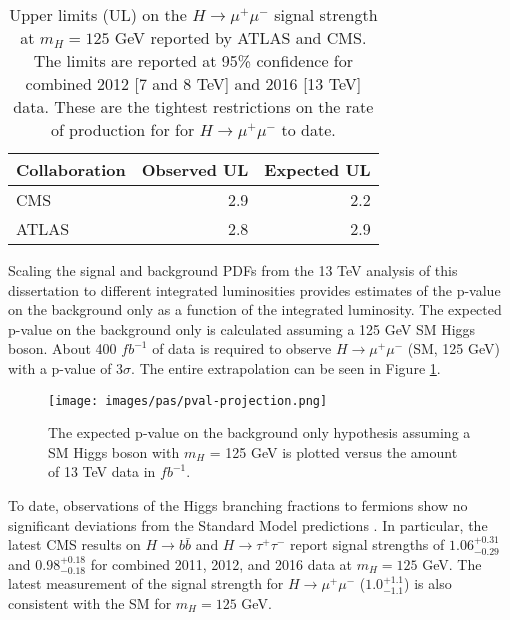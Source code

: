 \begin{table}[htb]
  \caption[Upper limits on the rate of production for $H\rightarrow\mu^+\mu^-$ at $m_H=125$ GeV.]{Upper limits (UL) on the $H\rightarrow\mu^+\mu^-$ signal strength at $m_H=125$ GeV reported by ATLAS \cite{atlashmumu2017} and CMS. The limits are reported at 95\% confidence for combined 2012 [7 and 8 TeV] and 2016 [13 TeV] data. These are the tightest restrictions on the rate of production for for $H\rightarrow\mu^+\mu^-$ to date.}
  \label{tab:cmsatlash2mu}
  \begin{center}
    \begin{tabular}{lrr}
      \hline
      Collaboration  & Observed UL & Expected UL  \\
      \hline
      CMS            &    2.9      & 2.2  \\
      ATLAS          &    2.8      & 2.9  \\
      \hline
    \end{tabular}
  \end{center}
\end{table}

Scaling the signal and background PDFs from the 13 TeV analysis of this dissertation to different integrated luminosities provides estimates of the p-value on the background only as a function of the integrated luminosity. The expected p-value on the background only is calculated assuming a 125 GeV SM Higgs boson. About 400 $fb^{-1}$ of data is required to observe $H\rightarrow\mu^+\mu^-$ (SM, 125 GeV) with a p-value of 3$\sigma$. The entire extrapolation can be seen in Figure \ref{fig:pvalprojection}.

\begin{figure}[h!]
    \centering
    \texttt{[image: images/pas/pval-projection.png]}
    \caption[The expected p-value for a 125 GeV SM Higgs boson versus the amount of 13 TeV data.]
    {The expected p-value on the background only hypothesis assuming a SM Higgs boson with $m_H$ = 125 GeV is plotted versus the amount of 13 TeV data in $fb^{-1}$.}
    \label{fig:pvalprojection}
\end{figure}

To date, observations of the Higgs branching fractions to fermions show no significant deviations from the Standard Model predictions \cite{cmshiggstau2017,cmshiggsbb2017, cmshmumu2017, atlashmumu2017}. In particular, the latest CMS results on $H\rightarrow b\bar{b}$ \cite{cmshiggsbb2017} and $H\rightarrow \tau^+\tau^-$ \cite{cmshiggstau2017} report signal strengths of $1.06^{+0.31}_{-0.29}$ and $0.98^{+0.18}_{-0.18}$ for combined 2011, 2012, and 2016 data at $m_H=125$ GeV. The latest measurement of the signal strength for $H\rightarrow\mu^+\mu^-$ ($1.0^{+1.1}_{-1.1}$) is also consistent with the SM for $m_H=125$ GeV. 


